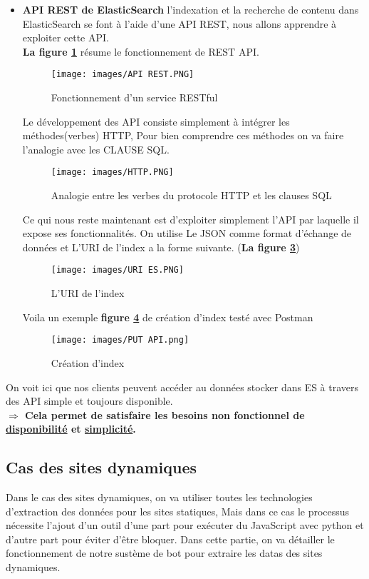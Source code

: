 \begin{itemize}[label=,font=\normalsize]
        \addtolength{\itemindent}{0cm}
        \item\textbf{API REST de ElasticSearch}
l'indexation et la recherche de contenu dans ElasticSearch se font à l'aide d'une API REST, nous allons apprendre à exploiter cette API.\\
\textbf{La figure \ref{fig:REST}} résume le fonctionnement de REST API.
\begin{figure}[H]
            \centering
            \texttt{[image: images/API REST.PNG]}
            \caption{Fonctionnement d'un service RESTful \cite{RestApi}}
            \label{fig:REST}  
        \end{figure}
Le développement des API consiste simplement à intégrer les méthodes(verbes) HTTP, Pour bien comprendre ces méthodes on va faire l'analogie avec les CLAUSE SQL.
\begin{figure}[H]
            \centering
            \texttt{[image: images/HTTP.PNG]}
            \caption{Analogie entre les verbes du protocole HTTP et les clauses SQL \cite{RestApi}}
            \label{fig:table}  
        \end{figure}
        Ce qui nous reste maintenant est d'exploiter simplement l'API par laquelle il expose ses fonctionnalités. On utilise Le JSON comme format d'échange de données et L'URI de l'index a la forme suivante. (\textbf{La figure \ref{fig:URI}})
        \begin{figure}[H]
            \centering
            \texttt{[image: images/URI ES.PNG]}
            \caption{L'URI de l'index \cite{RestApi}}
            \label{fig:URI}  
        \end{figure}
Voila un exemple \textbf{figure \ref{fig:Exemple1}} de création d'index testé avec Postman
\begin{figure}[H]
            \centering
            \texttt{[image: images/PUT API.png]}
            \caption{Création d'index}
            \label{fig:Exemple1}  
        \end{figure}
        \end{itemize}
On voit ici que nos clients peuvent accéder au données stocker dans ES à travers des API simple et toujours disponible.\\
\textbf{$\Rightarrow$ Cela permet de satisfaire les besoins non fonctionnel de \underline{disponibilité} et \underline{simplicité}.}

\subsection{Cas des sites dynamiques}
Dans le cas des sites dynamiques, on va utiliser toutes les technologies d'extraction des données pour les sites statiques, Mais dans ce cas le processus nécessite l'ajout d'un outil d'une part pour exécuter du JavaScript avec python et d'autre part pour éviter d’être bloquer.
Dans cette partie, on va détailler le fonctionnement de notre sustème de bot pour extraire les datas des sites dynamiques.  
